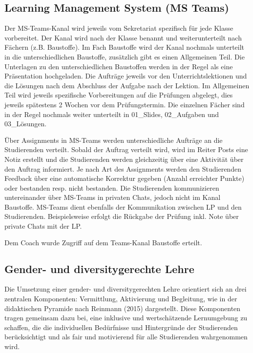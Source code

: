\documentclass[
11pt,
captions=tableheading,
smallheadings,
headsepline,
footsepline, 
parskip=half-,
]{scrartcl}
\begin{document}
\subsection{ Learning Management System (MS Teams)}
\label{sssec:MS_Teams_LMS}

Der MS-Teams-Kanal wird jeweils vom Sekretariat spezifisch für jede Klasse vorbereitet. Der Kanal wird nach der Klasse benannt und weiterunterteilt nach Fächern (z.B. Baustoffe). Im Fach Baustoffe wird der Kanal nochmals unterteilt in die unterschiedlichen Baustoffe, zusätzlich gibt es einen Allgemeinen Teil. Die Unterlagen zu den unterschiedlichen Baustoffen werden in der Regel als eine Präsentation hochgeladen. Die Aufträge jeweils vor den Unterrichtslektionen und die Lösungen nach dem Abschluss der Aufgabe nach der Lektion. Im Allgemeinen Teil wird jeweils spezifische Vorbereitungen auf die Prüfungen abgelegt, dies jeweils spätestens 2 Wochen vor dem Prüfungstermin. Die einzelnen Fächer sind in der Regel nochmals weiter unterteilt in 01\_Slides, 02\_Aufgaben und 03\_Lösungen.  

Über Assignments in MS-Teams werden unterschiedliche Aufträge an die Studierenden verteilt. Sobald der Auftrag verteilt wird, wird im Reiter Posts eine Notiz erstellt und die Studierenden werden gleichzeitig über eine Aktivität über den Auftrag informiert. Je nach Art des Assignments werden den Studierenden Feedback über eine automatische Korrektur  gegeben (Anzahl erreichter Punkte) oder bestanden resp. nicht bestanden. 
Die Studierenden kommunizieren untereinander über MS-Teams in privaten Chats, jedoch nicht im Kanal Baustoffe. MS-Teams dient ebenfalls der Kommunikation zwischen LP und den Studierenden. Beispielsweise erfolgt die Rückgabe der Prüfung inkl. Note über private Chats mit der LP. 

Dem Coach wurde Zugriff auf dem Teams-Kanal Baustoffe erteilt.

\subsection{Gender- und diversitygerechte Lehre}
Die Umsetzung einer gender- und diversitygerechten Lehre orientiert sich an drei zentralen Komponenten: Vermittlung, Aktivierung und Begleitung, wie in der didaktischen Pyramide nach Reinmann (2015) dargestellt. Diese Komponenten tragen gemeinsam dazu bei, eine inklusive und wertschätzende Lernumgebung zu schaffen, die die individuellen Bedürfnisse und Hintergründe der Studierenden berücksichtigt und als fair und motivierend für alle Studierenden wahrgenommen wird.
\end{document}
